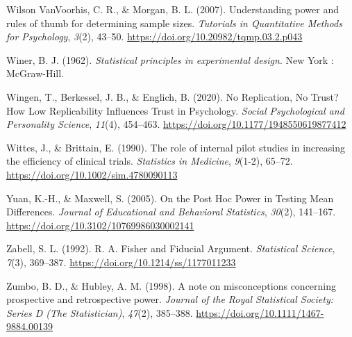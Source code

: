 \documentclass[
  letterpaper,
  DIV=11,
  numbers=noendperiod]{scrreprt}
\newlength{\cslhangindent}
\newlength{\cslentryspacingunit} %
\newenvironment{CSLReferences}[2] %
 {%
  \setlength{\parindent}{0pt}
  \ifodd #1
  \let\oldpar\par
  \def\par{\hangindent=\cslhangindent\oldpar}
  \fi
  \setlength{\parskip}{#2\cslentryspacingunit}
 }%
 {}
\begin{document}
\begin{CSLReferences}{1}{0}
\leavevmode{}%
Wilson VanVoorhis, C. R., \& Morgan, B. L. (2007). Understanding power
and rules of thumb for determining sample sizes. \emph{Tutorials in
Quantitative Methods for Psychology}, \emph{3}(2), 43--50.
\url{https://doi.org/10.20982/tqmp.03.2.p043}

\leavevmode{}%
Winer, B. J. (1962). \emph{Statistical principles in experimental
design}. {New York : McGraw-Hill}.

\leavevmode{}%
Wingen, T., Berkessel, J. B., \& Englich, B. (2020). No {Replication},
{No Trust}? {How Low Replicability Influences Trust} in {Psychology}.
\emph{Social Psychological and Personality Science}, \emph{11}(4),
454--463. \url{https://doi.org/10.1177/1948550619877412}

\leavevmode{}%
Wittes, J., \& Brittain, E. (1990). The role of internal pilot studies
in increasing the efficiency of clinical trials. \emph{Statistics in
Medicine}, \emph{9}(1-2), 65--72.
\url{https://doi.org/10.1002/sim.4780090113}

\leavevmode{}%
Yuan, K.-H., \& Maxwell, S. (2005). On the {Post Hoc Power} in {Testing
Mean Differences}. \emph{Journal of Educational and Behavioral
Statistics}, \emph{30}(2), 141--167.
\url{https://doi.org/10.3102/10769986030002141}

\leavevmode{}%
Zabell, S. L. (1992). R. {A}. {Fisher} and {Fiducial Argument}.
\emph{Statistical Science}, \emph{7}(3), 369--387.
\url{https://doi.org/10.1214/ss/1177011233}

\leavevmode{}%
Zumbo, B. D., \& Hubley, A. M. (1998). A note on misconceptions
concerning prospective and retrospective power. \emph{Journal of the
Royal Statistical Society: Series D (The Statistician)}, \emph{47}(2),
385--388. \url{https://doi.org/10.1111/1467-9884.00139}

\end{CSLReferences}
\end{document}
